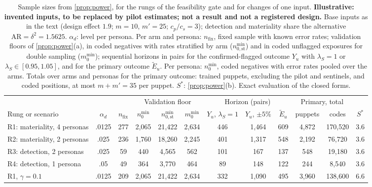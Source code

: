 \begin{table}[tbp]
\centering
\caption{Sample sizes from \cref{prop:power}, for the rungs of the feasibility gate and for changes of one input. \textbf{Illustrative: invented inputs, to be replaced by pilot estimates; not a result and not a registered design.} Base inputs as in the text (design effect $1.9$; $m=10$, $m'=25$; $c_p/c_s=3$); detection and materiality share the alternative $\mathrm{AR}=\delta^2=1.5625$. $\alpha_d$: level per persona. Per arm and persona: $n_{\mathrm{fix}}$, fixed sample with known error rates; validation floors of \cref{prop:power}(a), in coded negatives with rates stratified by arm ($n^{\min}_{0,\mathrm{st}}$) and in coded unflagged exposures for double sampling ($m_0^{\min}$); sequential horizons in pairs for the confirmed-flagged outcome $Y_u$ with $\lambda_S=1$ or $\lambda_S\in[0.95,1.05]$, and for the primary outcome $\widetilde E_u$. Per persona: $n_0^{\min}$, coded negatives with error rates pooled over the arms. Totals over arms and personas for the primary outcome: trained puppets, excluding the pilot and sentinels, and coded positions, at most $m+m'=35$ per puppet. $S^\ast$: \cref{prop:power}(b). Exact evaluation of the closed forms.}\label{tab:prot-power}\label{tab:pw-illus}
\scriptsize
\setlength{\tabcolsep}{2.6pt}
\begin{tabularx}{\textwidth}{@{}>{\raggedright\arraybackslash}Xccccccccccc@{}}
\toprule
 & & & \multicolumn{3}{c}{Validation floor} & \multicolumn{3}{c}{Horizon (pairs)} & \multicolumn{2}{c}{Primary, total} & \\
\cmidrule(lr){4-6}\cmidrule(lr){7-9}\cmidrule(lr){10-11}
Rung or scenario & $\alpha_d$ & $n_{\mathrm{fix}}$ & $n_0^{\min}$ & $n^{\min}_{0,\mathrm{st}}$ & $m_0^{\min}$ & $Y_u$, $\lambda_S{=}1$ & $Y_u$, $\pm5\%$ & $\widetilde E_u$ & puppets & codes & $S^\ast$ \\
\midrule
R1: materiality, 4 personas & .0125 & 277 & 2{,}065 & 21{,}422 & 2{,}634 & 446 & 1{,}464 & 609 & 4{,}872 & 170{,}520 & 3.6 \\
R2: materiality, 2 personas & .025 & 236 & 1{,}760 & 18{,}260 & 2{,}245 & 401 & 1{,}317 & 548 & 2{,}192 & 76{,}720 & 3.6 \\
R3: detection, 2 personas & .025 & 59 & 440 & 4{,}565 & 562 & 101 & 167 & 137 & 548 & 19{,}180 & 3.6 \\
R4: detection, 1 persona & .05 & 49 & 364 & 3{,}770 & 464 & 89 & 148 & 122 & 244 & 8{,}540 & 3.6 \\
\midrule
R1, $\gamma=0.1$ & .0125 & 209 & 2{,}065 & 21{,}422 & 2{,}634 & 332 & 1{,}090 & 495 & 3{,}960 & 138{,}600 & 6.6 \\

\end{tabularx}
\end{table}
